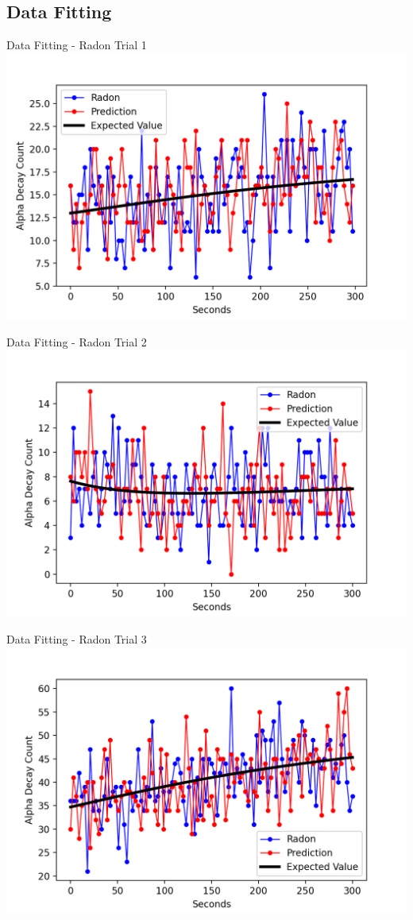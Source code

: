 \documentclass{beamer}
\newcommand{\nologo}{\setbeamertemplate{logo}{}}
\begin{document}
\subsection{Data Fitting}
{\nologo
\begin{frame}{Data Fitting - Radon Trial 1}
    \includegraphics[width=\textwidth]{images/Radon_Trial1.png}
\end{frame}
\begin{frame}{Data Fitting - Radon Trial 2}
    \includegraphics[width=\textwidth]{images/Radon_Trial2.png}
\end{frame}
\begin{frame}{Data Fitting - Radon Trial 3}
    \includegraphics[width=\textwidth]{images/Radon_Trial3.png}

\end{frame}}
\end{document}
